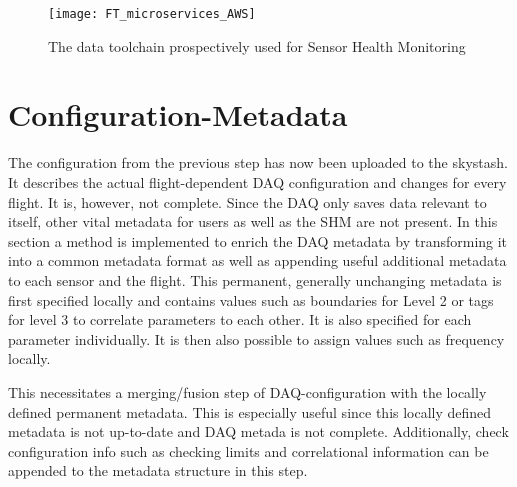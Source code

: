 \begin{figure}[h]
    \centering
    \texttt{[image: FT\_microservices\_AWS]}
    \caption{The data toolchain prospectively used for Sensor Health Monitoring}
    \label{fig:fti_microservices}
\end{figure}




\section{Configuration-Metadata}

The configuration from the previous step has now been uploaded to the skystash. It describes the actual flight-dependent DAQ configuration and changes for every flight. It is, however, not complete. Since the DAQ only saves data relevant to itself, other vital metadata for users as well as the SHM are not present. In this section a method is implemented to enrich the DAQ metadata by transforming it into a common metadata format as well as appending useful additional metadata to each sensor and the flight.
This permanent, generally unchanging metadata is first specified locally and contains values such as boundaries for Level 2 or tags for level 3 to correlate parameters to each other. It is also specified for each parameter individually. It is then also possible to assign values such as frequency locally.

This necessitates a merging/fusion step of DAQ-configuration with the locally defined permanent metadata. This is especially useful since this locally defined metadata is not up-to-date and DAQ metada is not complete. Additionally, check configuration info such as checking limits and correlational information can be appended to the metadata structure in this step.

